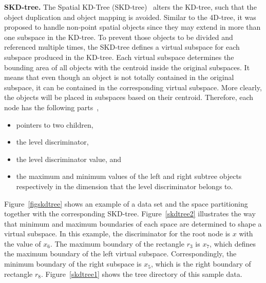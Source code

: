 \documentclass[a4paper,12pt]{article}
\begin{document}
\textbf{SKD-tree.} The Spatial KD-Tree (SKD-tree)~\cite{skdtree} alters the KD-tree, such that the object duplication and object mapping is avoided. Similar to the 4D-tree, it was proposed to handle non-point spatial objects since they may extend in more than one subspace in the KD-tree. To prevent those objects to be divided and referenced multiple times, the SKD-tree defines a virtual subspace for each subspace produced in the KD-tree. Each virtual subspace determines the bounding area of all objects with the centroid inside the original subspaces. It means that even though an object is not totally contained in the original subspace, it can be contained in the corresponding virtual subspace. More clearly, the objects will be placed in subspaces based on their centroid. Therefore, each node has the following parts~\cite{skdtreebook},
\begin{itemize}
\item pointers to two children,
\item the level discriminator,
\item the level discriminator value, and
\item the maximum and minimum values of the left and right subtree objects respectively in the dimension that the level discriminator belongs to.
\end{itemize}    
Figure~\ref{figskdtree} shows an example of a data set and the space partitioning together with the corresponding SKD-tree. Figure~\ref{skdtree2} illustrates the way that minimum and maximum boundaries of each space are determined to shape a virtual subspace. In this example, the discriminator for the root node is $x$ with the value of $x_6$.
The maximum boundary of the rectangle $r_3$ is $x_7$, which defines the maximum boundary of the left virtual subspace. Correspondingly, the minimum boundary of the right subspace is $x_5$, which is the right boundary of rectangle $r_8$. Figure~\ref{skdtree1} shows the tree directory of this sample data.
\end{document}
